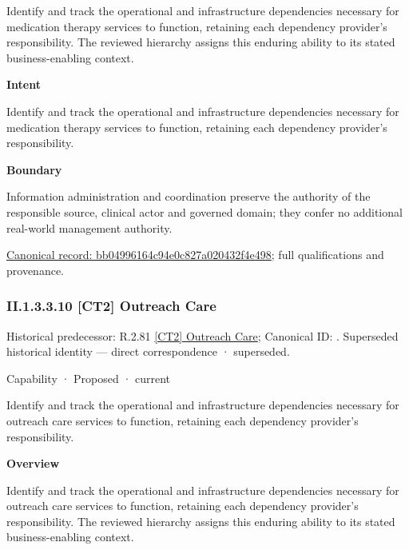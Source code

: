Identify and track the operational and infrastructure dependencies necessary for medication therapy services to function, retaining each dependency provider's responsibility. The reviewed hierarchy assigns this enduring ability to its stated business-enabling context.



\textbf{Intent}



Identify and track the operational and infrastructure dependencies necessary for medication therapy services to function, retaining each dependency provider's responsibility.



\textbf{Boundary}



Information administration and coordination preserve the authority of the responsible source, clinical actor and governed domain; they confer no additional real-world management authority.


{\footnotesize \href{../../../../../../../continuum/strategy/capability/bb04996164c94e0c827a020432f4e498.md}{Canonical record: bb04996164c94e0c827a020432f4e498}; full qualifications and provenance.}\par
\subsubsection*{II.1.3.3.10 [CT2] Outreach Care}
\label{navigation:II.1.3.3.10}

{\small Historical predecessor: R.2.81 \hyperref[element:75f8b32a3d5048ccbdfb30d61ae73dad]{[CT2] Outreach Care}; Canonical ID: \texttt{}. Superseded historical identity — direct correspondence · superseded.}\par
\label{element:b9ddbe2dd6a7485ba9cd3482215ea09e}
{\small Capability · Proposed · current}\par

Identify and track the operational and infrastructure dependencies necessary for outreach care services to function, retaining each dependency provider's responsibility.



\textbf{Overview}



Identify and track the operational and infrastructure dependencies necessary for outreach care services to function, retaining each dependency provider's responsibility. The reviewed hierarchy assigns this enduring ability to its stated business-enabling context.



